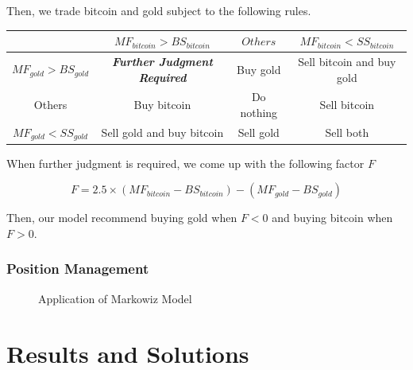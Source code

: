 \documentclass[12pt,a4paper]{article}
\begin{document}
\begin{spacing}{1.2}
Then, we trade bitcoin and gold subject to the following rules.
	
\begin{center}
		\begin{tabular}{ |c|c|c|c| } 
			\hline
			& $MF_{bitcoin} > BS_{bitcoin}$ & $Others$ & $MF_{bitcoin} < SS_{bitcoin}$ \\ 
			\hline
			$MF_{gold} > BS_{gold}$ & \textbf{\textit{Further Judgment Required}}  & Buy gold & Sell bitcoin and buy gold  \\ 
			\hline
			Others & Buy bitcoin & Do nothing & Sell bitcoin \\
			\hline
			$MF_{gold} < SS_{gold}$ & Sell gold and buy bitcoin & Sell gold & Sell both \\ 
			\hline
		\end{tabular}
\end{center}
	
When further judgment is required, we come up with the following factor $F$ 
	
$$
F=2.5 \times (MF_{bitcoin}-BS_{bitcoin})-(MF_{gold}-BS_{gold})
$$
	
Then, our model recommend buying gold when $F<0$ and buying bitcoin when $F>0$.

\subsubsection{Position Management}



\begin{figure}[H]
	\caption{Application of Markowiz Model}
	\label{figure:markowiz}
\end{figure}



\section{Results and Solutions}
\label{Results_Solutions}


\end{spacing}
\end{document}
